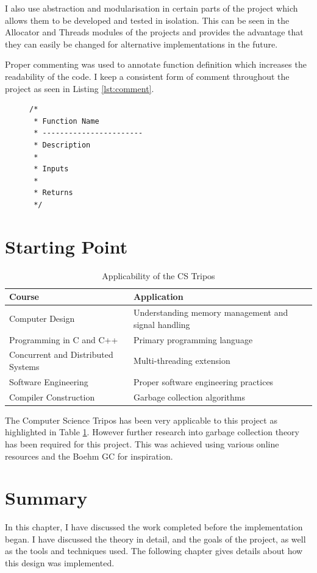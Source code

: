 \documentclass[../diss.tex]{subfiles}
\begin{document}
I also use abstraction and modularisation in certain parts of the project which allows them to be developed and tested in isolation. This can be seen in the Allocator and Threads modules of the projects and provides the advantage that they can easily be changed for alternative implementations in the future. 

Proper commenting was used to annotate function definition which increases the readability of the code. I keep a consistent form of comment throughout the project as seen in Listing \ref{lst:comment}.

\begin{figure}
\begin{lstlisting}[caption=Function comment example, label={lst:comment}]
/*
 * Function Name
 * -----------------------
 * Description
 *
 * Inputs
 *
 * Returns
 */
\end{lstlisting}
\end{figure}

\section{Starting Point} \label{sec:startingpoint}

\begin{table}
    \centering
    \begin{tabular}{| p{5cm} | p{10cm} |}
        \hline
        \bf{Course} & \bf{Application} \\ \hline
        Computer Design & Understanding memory management and signal handling \\ \hline
        Programming in C and C++ & Primary programming language \\ \hline
        Concurrent and Distributed Systems & Multi-threading extension \\ \hline
        Software Engineering & Proper software engineering practices \\ \hline
        Compiler Construction & Garbage collection algorithms \\ \hline
    \end{tabular}
    \caption{Applicability of the CS Tripos}
    \label{tab:tripos}
\end{table}

The Computer Science Tripos has been very applicable to this project as highlighted in Table \ref{tab:tripos}. However further research into garbage collection theory has been required for this project. This was achieved using various online resources and the Boehm GC for inspiration.

\section{Summary}

In this chapter, I have discussed the work completed before the implementation began. I have discussed the theory in detail, and the goals of the project, as well as the tools and techniques used. The following chapter gives details about how this design was implemented.
\end{document}
